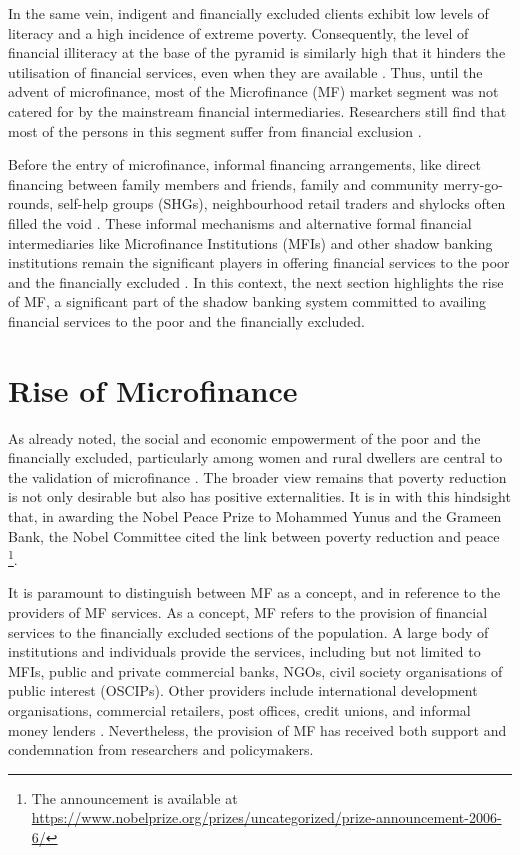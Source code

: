 \documentclass[a4paper, nobind]{templates/ociamthesis}
\begin{document}
In the same vein, indigent and financially excluded clients exhibit low levels of literacy and a high incidence of extreme poverty. Consequently, the level of financial illiteracy at the base of the pyramid is similarly high that it hinders the utilisation of financial services, even when they are available \autocite{engstrom2017financial}. Thus, until the advent of microfinance, most of the Microfinance (MF) market segment was not catered for by the mainstream financial intermediaries. Researchers still find that most of the persons in this segment suffer from financial exclusion \autocite{kota2007microfinance}.

Before the entry of microfinance, informal financing arrangements, like direct financing between family members and friends, family and community merry-go-rounds, self-help groups (SHGs), neighbourhood retail traders and shylocks often filled the void \autocite{klapper2015role}. These informal mechanisms and alternative formal financial intermediaries like Microfinance Institutions (MFIs) and other shadow banking institutions remain the significant players in offering financial services to the poor and the financially excluded \autocite{klapper2015role}. In this context, the next section highlights the rise of MF, a significant part of the shadow banking system committed to availing financial services to the poor and the financially excluded.

\hypertarget{rise-of-microfinance}{%
\section{Rise of Microfinance}\label{rise-of-microfinance}}

\noindent As already noted, the social and economic empowerment of the poor and the financially excluded, particularly among women and rural dwellers are central to the validation of microfinance \autocite{engstrom2017financial}. The broader view remains that poverty reduction is not only desirable but also has positive externalities. It is in with this hindsight that, in awarding the Nobel Peace Prize to Mohammed Yunus and the Grameen Bank, the Nobel Committee cited the link between poverty reduction and peace \footnote{The announcement is available at \url{https://www.nobelprize.org/prizes/uncategorized/prize-announcement-2006-6/}}.

It is paramount to distinguish between MF as a concept, and in reference to the providers of MF services. As a concept, MF refers to the provision of financial services to the financially excluded sections of the population. A large body of institutions and individuals provide the services, including but not limited to MFIs, public and private commercial banks, NGOs, civil society organisations of public interest (OSCIPs). Other providers include international development organisations, commercial retailers, post offices, credit unions, and informal money lenders \autocite{ledgerwood2006transforming,marconatto2016going}. Nevertheless, the provision of MF has received both support and condemnation from researchers and policymakers.
\end{document}
